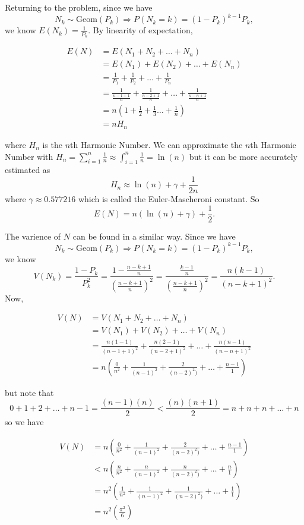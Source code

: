 Returning to the problem, since we have $$N_k \sim \text{Geom}(P_k) \Longrightarrow P(N_k=k)=(1-P_k)^{k-1}P_k,$$ we know $E(N_k)=\frac{1}{P_k}$. By linearity of expectation,

\begin{align*}E(N)&=E(N_1+N_2+\dots+N_n)\\&=E(N_1)+E(N_2)+\dots+E(N_n)\\&=\frac{1}{P_1}+\frac{1}{P_2}+\dots+\frac{1}{P_n}\\&=\frac{1}{\frac{n-1+1}{n}}+\frac{1}{\frac{n-2+1}{n}}+\dots+\frac{1}{\frac{n-n+1}{n}}\\&=n\left(1+\frac{1}{2}+\frac{1}{3}\dots+\frac{1}{n}\right)\\&=nH_n\end{align*}

where $H_n$ is the $n$th Harmonic Number. We can approximate the $n$th Harmonic Number with $H_n=\sum_{i=1}^n \frac{1}{n}\approx \int_{i=1}^n\frac{1}{n}=\ln (n)$ but it can be more accurately estimated as $$H_n\approx \ln (n)+\gamma+\frac{1}{2n}$$ where $\gamma \approx 0.577216$ which is called the Euler-Mascheroni constant. So $$E(N)=n(\ln (n)+\gamma)+\frac{1}{2}.$$

The varience of $N$ can be found in a similar way. Since we have $$N_k \sim \text{Geom}(P_k) \Longrightarrow P(N_k=k)=(1-P_k)^{k-1}P_k,$$ we know $$V(N_k)=\frac{1-P_k}{P_k^2}=\frac{1-\frac{n-k+1}{n}}{\left(\frac{n-k+1}{n}\right)^2}=\frac{\frac{k-1}{n}}{\left(\frac{n-k+1}{n}\right)^2}=\frac{n(k-1)}{(n-k+1)^2}.$$ Now,

\begin{align*}V(N)&=V(N_1+N_2+\dots+N_n)\\&=V(N_1)+V(N_2)+\dots+V(N_n)\\&=\frac{n(1-1)}{(n-1+1)^2}+\frac{n(2-1)}{(n-2+1)^2}+\dots+\frac{n(n-1)}{(n-n+1)^2}\\&=n\left(\frac{0}{n^2}+\frac{1}{(n-1)^2}+\frac{2}{(n-2)^2)}+\dots+\frac{n-1}{1}\right)\end{align*}

but note that $$0+1+2+\dots+n-1=\frac{(n-1)(n)}{2}<\frac{(n)(n+1)}{2}=n+n+n+\dots+n$$ so we have 

\begin{align*}V(N)&=n\left(\frac{0}{n^2}+\frac{1}{(n-1)^2}+\frac{2}{(n-2)^2)}+\dots+\frac{n-1}{1}\right)\\&<n\left(\frac{n}{n^2}+\frac{n}{(n-1)^2}+\frac{n}{(n-2)^2)}+\dots+\frac{n}{1}\right)\\&=n^2\left(\frac{1}{n^2}+\frac{1}{(n-1)^2}+\frac{1}{(n-2)^2)}+\dots+\frac{1}{1}\right)\\&=n^2\left(\frac{\pi^2}{6}\right)\end{align*}


